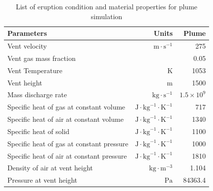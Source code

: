 \documentclass[utf8]{frontiersSCNS} %
\begin{document}
\begin{table}[htp]
	\centering
\caption{List of eruption condition and material properties for plume simulation}		
	 \begin{tabular}{lrr}
	 \hline
	 Parameters & Units & Plume \\
	 \hline
	 Vent velocity & $\mathrm{m}\cdot \mathrm{s}^{-1}$ & 275 \\
	 Vent gas mass fraction & & 0.05 \\
	 Vent Temperature & K & 1053 \\
	 Vent height & m & 1500 \\
	 Mass discharge rate & $\mathrm{kg}\cdot \mathrm{s}^{-1}$ & $1.5 \times 10^9$\\
	 	Specific heat of gas at constant volume & $\mathrm{J} \cdot \mathrm{kg}^{-1}\cdot \mathrm{K}^{-1}$ & 717 \\
	 Specific heat of air at constant volume &  $\mathrm{J} \cdot \mathrm{kg}^{-1}\cdot \mathrm{K}^{-1}$ & 1340 \\
	 	Specific heat of solid & $\mathrm{J} \cdot \mathrm{kg}^{-1}\cdot \mathrm{K}^{-1}$ & 1100 \\
	 	Specific heat of gas at constant pressure & $\mathrm{J} \cdot \mathrm{kg}^{-1}\cdot \mathrm{K}^{-1}$ & 1000 \\
	 	Specific heat of air at constant pressure & $\mathrm{J} \cdot \mathrm{kg}^{-1}\cdot \mathrm{K}^{-1}$ & 1810 \\
	 	Density of air at vent height & $\mathrm{kg} \cdot \mathrm{m}^{-3}$ & 1.104 \\
	 Pressure at vent height & $\mathrm{Pa}$ & 84363.4 \\
	 \hline
	 \end{tabular}
	 \label{tab:input_parameters_plume_simulation}
\end{table}
\end{document}
